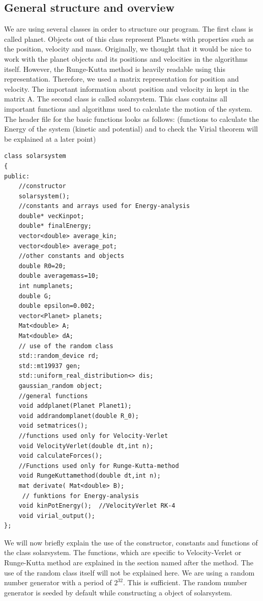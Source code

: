 \documentclass[10pt,a4paper]{article}
\begin{document}
\subsection{General structure and overview}
We are using several classes in order to structure our program. The first class is called planet. Objects out of this class represent Planets with properties such as the position, velocity and mass. Originally, we thought that it would be nice to work with the planet objects and its positions and velocities in the algorithms itself. However, the Runge-Kutta method is heavily readable using this representation. Therefore, we used a matrix representation for position and velocity. The important information about position and velocity in kept in the matrix A. 
The second class is called solarsystem. This class contains all important functions and algorithms used to calculate the motion of the system. 
The header file for the basic functions looks as follows: (functions to calculate the Energy of the system (kinetic and potential) and to check the Virial theorem will be explained at a later point)
\begin{lstlisting}
class solarsystem
{
public:
    //constructor
    solarsystem();
    //constants and arrays used for Energy-analysis
    double* vecKinpot;
    double* finalEnergy;
    vector<double> average_kin; 
    vector<double> average_pot; 
    //other constants and objects 
    double R0=20;
    double averagemass=10;
    int numplanets;
    double G;
    double epsilon=0.002;
    vector<Planet> planets;
    Mat<double> A;
    Mat<double> dA;
    // use of the random class
    std::random_device rd;
    std::mt19937 gen;
    std::uniform_real_distribution<> dis;
    gaussian_random object;
    //general functions
    void addplanet(Planet Planet1);
    void addrandomplanet(double R_0);
    void setmatrices();
    //functions used only for Velocity-Verlet
    void VelocityVerlet(double dt,int n);
    void calculateForces();
    //Functions used only for Runge-Kutta-method
    void RungeKuttamethod(double dt,int n);
    mat derivate( Mat<double> B);
     // funktions for Energy-analysis
    void kinPotEnergy();  //VelocityVerlet RK-4
    void virial_output();
};
\end{lstlisting}
We will now briefly explain the use of the constructor, constants and functions of the class solarsystem. The functions, which are specific to Velocity-Verlet or Runge-Kutta method are explained in the section named after the method. The use of the random class itself will not be explained here. We are using a random number generator with a period of $2^{32}$. This is sufficient. The random number generator is seeded by default while constructing a object of solarsystem. 
\end{document}
